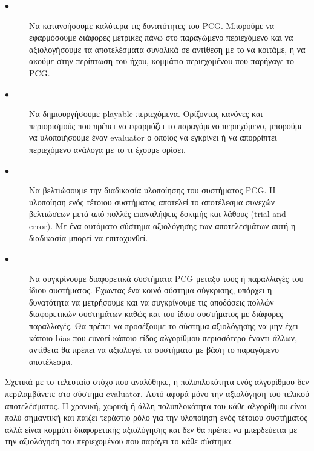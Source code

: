 \begin{description}
  \item[$\bullet$] Nα κατανοήσουμε καλύτερα τις δυνατότητες του PCG. Mπορούμε να εφαρμόσουμε διάφορες μετρικές πάνω στο παραγώμενο περιεχόμενο και να αξιολογήσουμε τα αποτελέσματα συνολικά σε αντίθεση με το να κοιτάμε, ή να ακούμε στην περίπτωση του ήχου, κομμάτια περιεχομένου που παρήγαγε το PCG.
    \item[$\bullet$] Nα δημιουργήσουμε playable περιεχόμενα. Ορίζοντας κανόνες και περιορισμούς που πρέπει να εφαρμόζει το παραγόμενο περιεχόμενο, μπορούμε να υλοποιήσουμε έναν evaluator ο οποίος να εγκρίνει ή να απορρίπτει περιεχόμενο ανάλογα με το τι έχουμε ορίσει.
    \item[$\bullet$] Nα βελτιώσουμε την διαδικασία υλοποίησης του συστήματος PCG. Η υλοποίηση ενός τέτοιου συστήματος αποτελεί το αποτέλεσμα συνεχών βελτιώσεων μετά από πολλές επαναλήψεις δοκιμής και λάθους (trial and error). Με ένα αυτόματο σύστημα αξιολόγησης των αποτελεσμάτων αυτή η διαδικασία μπορεί να επιταχυνθεί.
    \item[$\bullet$] Nα συγκρίνουμε διαφορετικά συστήματα PCG μεταξυ τους ή παραλλαγές του ίδιου συστήματος. Έχωντας ένα κοινό σύστημα σύγκρισης, υπάρχει η δυνατότητα να μετρήσουμε και να συγκρίνουμε τις αποδόσεις πολλών διαφορετικών συστημάτων καθώς και του ίδιου συστήματος με διάφορες παραλλαγές. Θα πρέπει να προσέξουμε το σύστημα αξιολόγησης να μην έχει κάποιο bias που ευνοεί κάποιο είδος αλγορίθμου περισσότερο έναντι άλλων, αντίθετα θα πρέπει να αξιολογεί τα συστήματα με βάση το παραγόμενο αποτέλεσμα.
\end{description}
\par
Σχετικά με το τελευταίο στόχο που αναλύθηκε, η πολυπλοκότητα ενός αλγορίθμου δεν περιλαμβάνετε στο σύστημα evaluator. Αυτό αφορά μόνο την αξιολόγηση του τελικού αποτελέσματος. Η χρονική, χωρική ή άλλη πολυπλοκότητα του κάθε αλγορίθμου είναι πολύ σημαντική και παίζει τεράστιο ρόλο για την υλοποίηση ενός τέτοιου συστήματος αλλά είναι κομμάτι διαφορετικής αξιολόγησης και δεν θα πρέπει να μπερδεύεται με την αξιολόγηση του περιεχομένου που παράγει το κάθε σύστημα.

